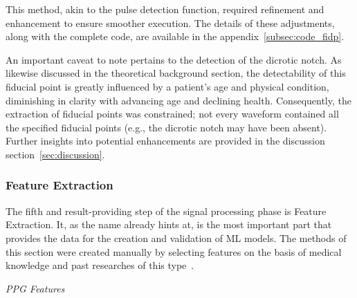 This method, akin to the pulse detection function, required refinement and enhancement to ensure smoother execution.
The details of these adjustments, along with the complete code, are available in the appendix~\ref{subsec:code_fidp}.

An important caveat to note pertains to the detection of the dicrotic notch.
As likewise discussed in the theoretical background section, the detectability of this fiducial point is greatly influenced by a patient's age and physical condition,
diminishing in clarity with advancing age and declining health.
Consequently, the extraction of fiducial points was constrained; not every waveform contained all the specified fiducial points (e.g., the dicrotic notch may have been absent).
Further insights into potential enhancements are provided in the discussion section~\ref{sec:discussion}.

\subsubsection{Feature Extraction}
\label{subsubsec:features}

The fifth and result-providing step of the signal processing phase is Feature Extraction.
It, as the name already hints at, is the most important part that provides the data for the creation and validation of ML models.
The methods of this section were created manually by selecting features on the basis of medical knowledge and past researches of this type~\cite{el-hajjDeepLearningModels2021, charltonAssessingHemodynamicsPhotoplethysmogram2022, maqsoodSurveyShallowDeep2022}.

\vspace{0.2cm}
\textit{PPG Features}
\vspace{0.2cm}

